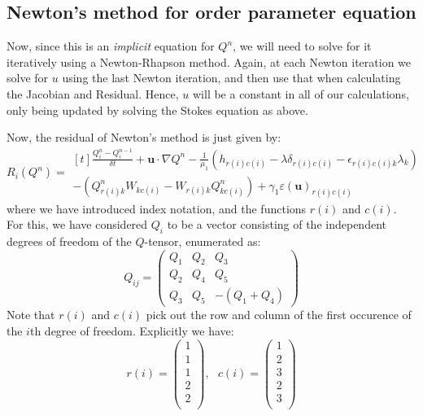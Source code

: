 \documentclass[reqno]{article}
\begin{document}
  \subsection{Newton's method for order parameter equation}
  Now, since this is an \textit{implicit} equation for $Q^n$, we will need to
  solve for it iteratively using a Newton-Rhapson method.
  Again, at each Newton iteration we solve for $u$ using the last Newton
  iteration, and then use that when calculating the Jacobian and Residual.
  Hence, $u$ will be a constant in all of our calculations, only being updated
  by solving the Stokes equation as above.

  Now, the residual of Newton's method is just given by:
  \begin{equation}
    R_i(Q^n)
    =
    \begin{multlined}[t]
    \frac{Q_i^n - Q_i^{n - 1}}{\delta t}
    + \mathbf{u} \cdot \nabla Q^n
    -
    \frac{1}{\mu_1} \left( h_{r(i)c(i)} - \lambda \delta_{r(i)c(i)} - \epsilon_{r(i)c(i)k} \lambda_k \right) \\
    - \left( Q^n_{r(i)k} W_{kc(i)} - W_{r(i)k} Q_{kc(i)}^n \right)
    + \gamma_1 \varepsilon(\mathbf{u})_{r(i)c(i)}
    \end{multlined}
  \end{equation}
  where we have introduced index notation, and the functions $r(i)$ and $c(i)$.
  For this, we have considered $Q_i$ to be a vector consisting of the
  independent degrees of freedom of the $Q$-tensor, enumerated as:
  \begin{equation}
    Q_{ij}
    =
    \begin{pmatrix}
      Q_1 &Q_2 &Q_3 \\
      Q_2 &Q_4 &Q_5 \\
      Q_3 &Q_5 &-(Q_1 + Q_4)
    \end{pmatrix}
  \end{equation}
  Note that $r(i)$ and $c(i)$ pick out the row and column of the first occurence
  of the $i$th degree of freedom.
  Explicitly we have:
  \begin{equation}
    r(i)
    =
    \begin{pmatrix}
      1 \\
      1 \\
      1 \\
      2 \\
      2 \\
    \end{pmatrix}
    ,
    \:\:\:
    c(i)
    =
    \begin{pmatrix}
      1 \\
      2 \\
      3 \\
      2 \\
      3 \\
    \end{pmatrix}
  \end{equation}
\end{document}
